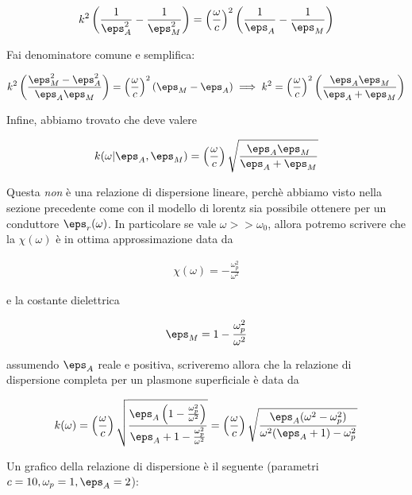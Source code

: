 \documentclass{report}
\begin{document}
\begin{align}
    k^2\left(\frac{1}{\eps_A^2} - \frac{1}{\eps_M^2} \right) = \left(\frac{\omega}{c} \right)^2 \left(\frac{1}{\eps_A} - \frac{1}{\eps_M} \right)
\end{align}

Fai denominatore comune e semplifica: 

\begin{align}
    k^2 \left(\frac{\eps_M^2 - \eps_A^2}{\eps_A\eps_M} \right) = \left(\frac{\omega}{c} \right)^2(\eps_M -\eps_A) \implies k^2 = \left(\frac{\omega}{c} \right)^2\left(\frac{\eps_A\eps_M}{\eps_A + \eps_M} \right) 
\end{align}

Infine, abbiamo trovato che deve valere 

\begin{align}
    k(\omega | \eps_A, \eps_M) = \left(\frac{\omega}{c}\right)\sqrt{\frac{\eps_A\eps_M}{\eps_A + \eps_M}}
\end{align}

Questa \emph{non} è una relazione di dispersione lineare, perchè abbiamo visto nella sezione precedente come con il modello di lorentz sia possibile ottenere per un conduttore \(\eps_r(\omega)\). In particolare se vale \(\omega >> \omega_0\), allora potremo scrivere che la \(\chi(\omega)\) è in ottima approssimazione data da 

\begin{align}
    \chi(\omega) = -\frac{\omega_p^2}{\omega^2}
\end{align}

e la costante dielettrica 

\begin{align}
    \eps_M = 1 -  \frac{\omega_p^2}{\omega^2}
\end{align}

assumendo \(\eps_A\) reale e positiva, scriveremo allora che la relazione di dispersione completa per un plasmone superficiale è data da 

\begin{align}
    k(\omega) = \left(\frac{\omega}{c}\right)\sqrt{\frac{\eps_A\left(1 - \frac{\omega_p^2}{\omega^2}\right)}{\eps_A + 1 - \frac{\omega_p^2}{\omega^2}}} = \left(\frac{\omega}{c} \right)\sqrt{\frac{\eps_A(\omega^2 - \omega_p^2)}{\omega^2(\eps_A + 1)-\omega_p^2}}
\end{align}

Un grafico della relazione di dispersione è il seguente (parametri \(c=10, \omega_p = 1, \eps_A = 2\)): 
\end{document}
